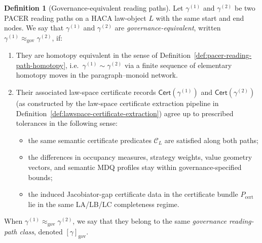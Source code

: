 \documentclass[11pt]{book}
\theoremstyle{plain}
\theoremstyle{definition}
\newtheorem{definition}[theorem]{Definition}
\theoremstyle{remark}
\begin{document}
\begin{definition}[Governance-equivalent reading paths]
\label{def:governance-equivalent-reading-paths}
Let $\gamma^{(1)}$ and $\gamma^{(2)}$ be two PACER reading paths on a
HACA law-object $L$ with the same start and end nodes. We say that
$\gamma^{(1)}$ and $\gamma^{(2)}$ are \emph{governance-equivalent},
written $\gamma^{(1)}\approx_{\mathrm{gov}}\gamma^{(2)}$, if:
\begin{enumerate}
  \item They are homotopy equivalent in the sense of
        Definition~\ref{def:pacer-reading-path-homotopy}, i.e.\
        $\gamma^{(1)}\sim\gamma^{(2)}$ via a finite sequence of
        elementary homotopy moves in the paragraph–monoid network.
  \item Their associated law-space certificate records
        $\mathsf{Cert}(\gamma^{(1)})$ and
        $\mathsf{Cert}(\gamma^{(2)})$ (as constructed by the
        law-space certificate extraction pipeline in
        Definition~\ref{def:lawspace-certificate-extraction}) agree
        up to prescribed tolerances in the following sense:
        \begin{itemize}
          \item the same semantic certificate predicates
                $\mathcal{C}_L$ are satisfied along both paths;
          \item the differences in occupancy measures, strategy weights,
                value geometry vectors, and semantic MDQ profiles stay
                within governance-specified bounds;
          \item the induced Jacobiator-gap certificate data in the
                certificate bundle $P_{\mathrm{cert}}$ lie in the same
                LA/LB/LC completeness regime.
        \end{itemize}
\end{enumerate}
When $\gamma^{(1)}\approx_{\mathrm{gov}}\gamma^{(2)}$, we say that they
belong to the same \emph{governance reading-path class}, denoted
$[\gamma]_{\mathrm{gov}}$.
\end{definition}
\end{document}
